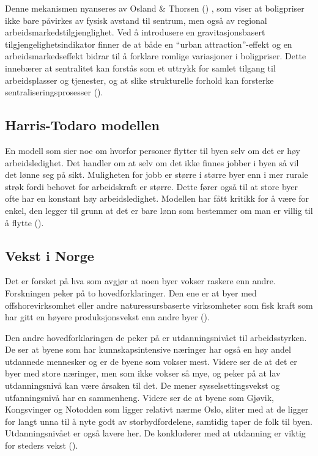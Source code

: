 \documentclass[
  norsk,
  letterpaper,
  DIV=11,
  numbers=noendperiod]{scrartcl}
\begin{document}
Denne mekanismen nyanseres av Osland \& Thorsen
() , som viser at boligpriser ikke bare
påvirkes av fysisk avstand til sentrum, men også av regional
arbeidsmarkedstilgjenglighet. Ved å introdusere en gravitasjonsbasert
tilgjengelighetsindikator finner de at både en ``urban
attraction''-effekt og en arbeidsmarkedseffekt bidrar til å forklare
romlige variasjoner i boligpriser. Dette innebærer at sentralitet kan
forstås som et uttrykk for samlet tilgang til arbeidsplasser og
tjenester, og at slike strukturelle forhold kan forsterke
sentraliseringsprosesser ().

\subsection{Harris-Todaro modellen}\label{harris-todaro-modellen}

En modell som sier noe om hvorfor personer flytter til byen selv om det
er høy arbeidsledighet. Det handler om at selv om det ikke finnes jobber
i byen så vil det lønne seg på sikt. Muligheten for jobb er større i
større byer enn i mer rurale strøk fordi behovet for arbeidskraft er
større. Dette fører også til at store byer ofte har en konstant høy
arbeidsledighet. Modellen har fått kritikk for å være for enkel, den
legger til grunn at det er bare lønn som bestemmer om man er villig til
å flytte ().

\subsection{Vekst i Norge}\label{vekst-i-norge}

Det er forsket på hva som avgjør at noen byer vokser raskere enn andre.
Forskningen peker på to hovedforklaringer. Den ene er at byer med
offshorevirksomhet eller andre naturessursbaserte virksomheter som fisk
kraft som har gitt en høyere produksjonsvekst enn andre byer
().

Den andre hovedforklaringen de peker på er utdanningsnivået til
arbeidsstyrken. De ser at byene som har kunnskapsintensive næringer har
også en høy andel utdannede mennesker og er de byene som vokser mest.
Videre ser de at det er byer med store næringer, men som ikke vokser så
mye, og peker på at lav utdanningsnivå kan være årsaken til det. De
mener sysselsettingsvekst og utfanningsnivå har en sammenheng. Videre
ser de at byene som Gjøvik, Kongsvinger og Notodden som ligger relativt
nærme Oslo, sliter med at de ligger for langt unna til å nyte godt av
storbydfordelene, samtidig taper de folk til byen. Utdanningsnivået er
også lavere her. De konkluderer med at utdanning er viktig for steders
vekst ().
\end{document}
